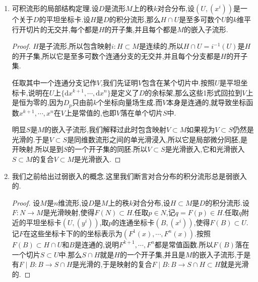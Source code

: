 \begin{enumerate}
\begin{proof}
		按照$\partial/\partial x^i\mid_{\pi(q)}=(\mathrm{d}\pi\mid D_q)V_i\mid_q=\mathrm{d}\pi_q(V_i\mid_q)$,得到$V_i$和$\partial/\partial x^i$是$\pi$相关的.于是得到$[V_i,V_j]$和$[\partial/\partial x^i,\partial/\partial x^j]$是$pi$相关的,也即$\mathrm{d}\pi_q([V_i,V_j]_q)=[\partial/\partial x^i,\partial/\partial x^j]_{\pi(q)}=0$.按照$D$是对合分布,说明$[V_i,V_j]_q\in D_q$,所以按照$\mathrm{d}\pi\mid D_q$是单射就得到$[V_i,V_j]_q=0$,所以$[V_i,V_j]\equiv0,\forall i,j$,完成证明.
	\end{proof}
    \item 可积流形的局部结构定理.设$D$是流形$M$上的秩$k$对合分布,设$(U,(x^i))$是一个关于$D$的平坦坐标卡.设$H$是$D$的积分流形,那么$H\cap U$是至多可数个$U$的$k$维平行开切片的无交并,每个都是$H$的开子集,并且每个都是$M$的嵌入子流形.
    \begin{proof}
    	
    	$H$是子流形,所以包含映射$i:H\subset M$是连续的,所以$H\cap U=i^{-1}(U)$是$H$的开子集,所以它是至多可数个连通分支的无交并,并且每个分支都是$H$的开子集.
    	
    	任取其中一个连通分支记作$V$,我们先证明$V$包含在某个切片中.按照$U$是平坦坐标卡,说明在$U$上$\{\mathrm{d}x^{k+1},\cdots,\mathrm{d}x^n\}$是定义了$D$的余标架,那么这些1形式回拉到$V$上是恒为零的,因为$D_p$只由前$k$个坐标向量场生成.而$V$本身是连通的,就导致坐标函数$x^{k+1},\cdots,x^n$在$V$上是常值的,也即$V$落在单个切片$S$中.
    	
    	明显$S$是$M$的嵌入子流形,我们解释过此时包含映射$V\subset M$如果视为$V\subset S$仍然是光滑的.于是$V\subset S$是同维数流形之间的单光滑浸入,所以它是局部微分同胚,是开映射,所以是到$S$的一个开子集的同胚.所以$V\subset S$是光滑嵌入,它和光滑嵌入$S\subset M$的复合$V\subset M$是光滑嵌入.
    \end{proof}
    \item 我们之前给出过弱嵌入的概念.这里我们断言对合分布的积分流形总是弱嵌入的.
    \begin{proof}
    	
    	设$M$是$n$维流形,设$D$是$M$上的秩$k$对合分布,设$H\subset M$是$D$的积分流形.设$F:N\to M$是光滑映射,使得$F(N)\subset H$.任取$p\in N$,记$q=F(p)\in H$.任取$q$附近的平坦坐标卡$(U,(y^i))$,取$p$的连通坐标卡$(B,(x^i))$,使得$F(B)\subset U$.记$F$在这些坐标卡下的的坐标表示为$(F^1(x),\cdots,F^n(x))$.按照$F(B)\subset H\cap U$和$B$是连通的,说明$F^{k+1},\cdots,F^n$都是常值函数.所以$F(B)$落在一个切片$S\subset U$中.那么$S\cap H$就是$H$的一个开子集,并且是$M$的嵌入子流形,于是有$F\mid B:B\to S\cap H$是光滑的,于是映射的复合$F\mid B:B\to S\cap H\subset H$就是光滑的.
    \end{proof}
\end{enumerate}

